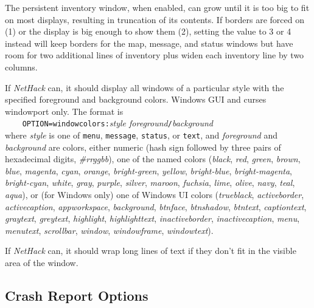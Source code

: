 \documentclass[titlepage]{article}
\begin{document}
\begin{description}[font=\mdseries\itshape]
The persistent inventory window, when enabled, can grow until it is
too big to fit on most displays, resulting in truncation of its contents.
If borders are forced on (1) or the display is big enough to show them (2),
setting the value to 3 or 4 instead will keep borders for the map, message,
and status windows but have room for two additional lines of inventory
plus widen each inventory line by two columns.
\item[windowcolors]
If \textit{NetHack} can, it should display all windows of a particular style
with the specified foreground and background colors.
Windows GUI and curses windowport only.
The format is\\
\texttt{~~~~OPTION=windowcolors:}\textit{style foreground}\texttt{/}\textit{background}\\
where \textit{style} is one of \texttt{menu}, \texttt{message}, \texttt{status},
or \texttt{text}, and
\textit{foreground} and \textit{background} are colors, either numeric (hash
sign followed by three pairs of hexadecimal digits, \textit{\#rrggbb}),
one of the named colors (\textit{black}, \textit{red}, \textit{green}, \textit{brown},
\textit{blue}, \textit{magenta}, \textit{cyan}, \textit{orange},
\textit{bright-green}, \textit{yellow}, \textit{bright-blue}, \textit{bright-magenta},
\textit{bright-cyan}, \textit{white}, \textit{gray}, \textit{purple},
\textit{silver}, \textit{maroon}, \textit{fuchsia}, \textit{lime}, \textit{olive},
\textit{navy}, \textit{teal}, \textit{aqua}),
or (for Windows only) one of Windows UI colors (\textit{trueblack},
\textit{activeborder}, \textit{activecaption}, \textit{appworkspace}, \textit{background},
\textit{btnface}, \textit{btnshadow}, \textit{btntext}, \textit{captiontext},
\textit{graytext}, \textit{greytext}, \textit{highlight},
\textit{highlighttext}, \textit{inactiveborder}, \textit{inactivecaption}, \textit{menu},
\textit{menutext}, \textit{scrollbar}, \textit{window}, \textit{windowframe},
\textit{windowtext}).

\item[wraptext]
If \textit{NetHack} can, it should wrap long lines of text if they don't fit
in the visible area of the window.
\end{description}

\subsection*{Crash Report Options}
\end{document}
